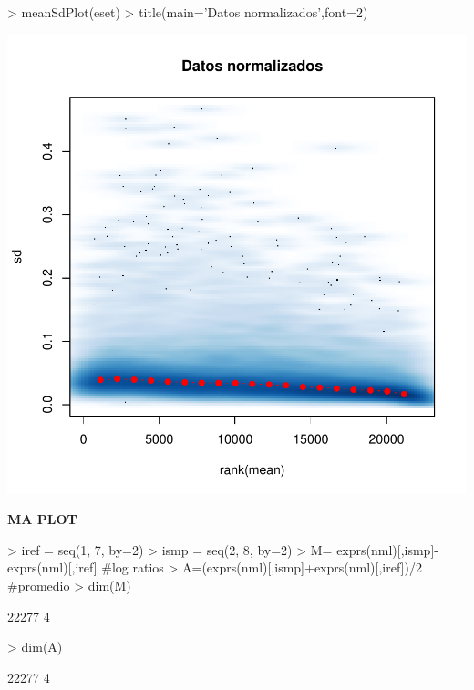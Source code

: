 \documentclass{article}
\begin{document}
\begin{Schunk}
\begin{Sinput}
> meanSdPlot(eset)
> title(main='Datos normalizados',font=2)
\end{Sinput}
\end{Schunk}
\includegraphics{JuanHenao_Taller3-002}

\textbf{MA PLOT}

\begin{Schunk}
\begin{Sinput}
> iref = seq(1, 7, by=2)
> ismp = seq(2, 8, by=2)
> M= exprs(nml)[,ismp]-exprs(nml)[,iref] #log ratios
> A=(exprs(nml)[,ismp]+exprs(nml)[,iref])/2 #promedio
> dim(M)
\end{Sinput}
\begin{Soutput}
[1] 22277     4
\end{Soutput}
\begin{Sinput}
> dim(A)
\end{Sinput}
\begin{Soutput}
[1] 22277     4
\end{Soutput}
\end{Schunk}
\end{document}
